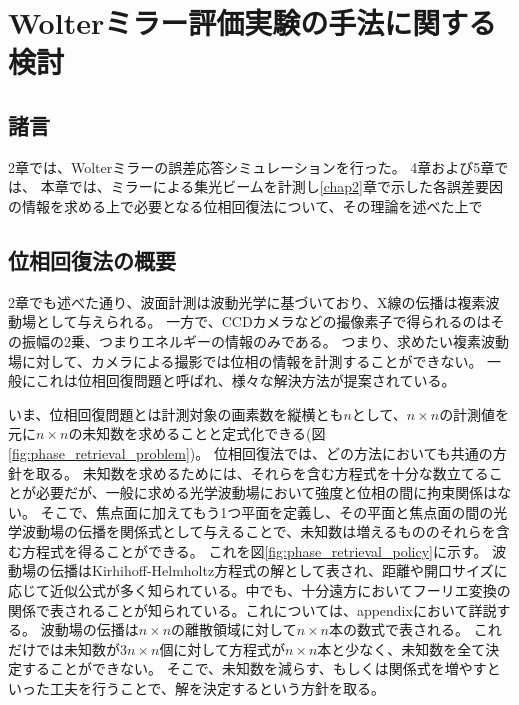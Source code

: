 \chapter{Wolterミラー評価実験の手法に関する検討}
\thispagestyle{empty}
\label{chap3}
\graphicspath{{chap3/figure/}}
\minitoc

\newpage


\section{諸言}
\label{chap3_introduction}

2章では、Wolterミラーの誤差応答シミュレーションを行った。
4章および5章では、
本章では、ミラーによる集光ビームを計測し\ref{chap2}章で示した各誤差要因の情報を求める上で必要となる位相回復法について、その理論を述べた上で

\clearpage
\newpage


\section{位相回復法の概要}

2章でも述べた通り、波面計測は波動光学に基づいており、X線の伝播は複素波動場として与えられる。
一方で、CCDカメラなどの撮像素子で得られるのはその振幅の2乗、つまりエネルギーの情報のみである。
つまり、求めたい複素波動場に対して、カメラによる撮影では位相の情報を計測することができない。
一般にこれは位相回復問題と呼ばれ、様々な解決方法が提案されている。

いま、位相回復問題とは計測対象の画素数を縦横とも$n$として、$n \times n$の計測値を元に$n \times n$の未知数を求めることと定式化できる(図\ref{fig:phase_retrieval_problem})。
位相回復法では、どの方法においても共通の方針を取る。
未知数を求めるためには、それらを含む方程式を十分な数立てることが必要だが、一般に求める光学波動場において強度と位相の間に拘束関係はない。
そこで、焦点面に加えてもう1つ平面を定義し、その平面と焦点面の間の光学波動場の伝播を関係式として与えることで、未知数は増えるもののそれらを含む方程式を得ることができる。
これを図\ref{fig:phase_retrieval_policy}に示す。
波動場の伝播はKirhihoff-Helmholtz方程式の解として表され、距離や開口サイズに応じて近似公式が多く知られている。中でも、十分遠方においてフーリエ変換の関係で表されることが知られている。これについては、appendixにおいて詳説する。
波動場の伝播は$n \times n$の離散領域に対して$n \times n$本の数式で表される。
これだけでは未知数が$3n \times n$個に対して方程式が$n \times n$本と少なく、未知数を全て決定することができない。
そこで、未知数を減らす、もしくは関係式を増やすといった工夫を行うことで、解を決定するという方針を取る。

